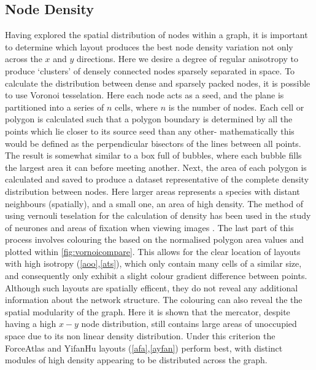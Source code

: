 \subsection{Node Density}\label{sec:nodedensitya}
Having explored the spatial distribution of nodes within a graph, it is important to determine which layout produces the best node density variation not only across the $x$ and $y$ directions. Here we desire a degree of regular anisotropy to produce `clusters' of densely connected nodes sparsely separated in space. To calculate the distribution between dense and sparsely packed nodes, it is possible to use Voronoi tesselation. Here each node acts as a seed, and the plane is partitioned into a series of $n$ cells, where $n$ is the number of nodes. Each cell or polygon is calculated such that a polygon boundary is determined by all the points which lie closer to its source seed than any other- mathematically this would be defined as the perpendicular bisectors of the lines between all points. The result is somewhat similar to a box full of bubbles, where each bubble fills the largest area it can before meeting another. Next, the area of each polygon is calculated and saved to produce a dataset representative of the complete density distribution between nodes. Here larger areas represents a species with distant neighbours (spatially), and a small one, an area of high density. The method of using vernouli teselation for the calculation of density has been used in the study of neurones \citep{neurone} and areas of fixation when viewing images \citep{fixation}. 
The last part of this process involves colouring the based on the normalised polygon area values and plotted within \autoref{fig:vornoicompare}. This allows for the clear location of layouts with high isotropy (\autoref{aoo},\autoref{ats}), which only contain many cells of a similar size, and consequently only exhibit a slight colour gradient difference between points. Although such layouts are spatially efficent, they do not reveal any additional information about the network structure. 
The colouring can also reveal the the spatial modularity of the graph. Here it is shown that the mercator, despite having a high $x-y$ node distribution, still contains large areas of unoccupied space due to its non linear density distribution. Under this criterion the ForceAtlas and YifanHu layouts (\autoref{afa},\autoref{ayfan}) perform best, with distinct modules of high density appearing to be distributed across the graph. 



